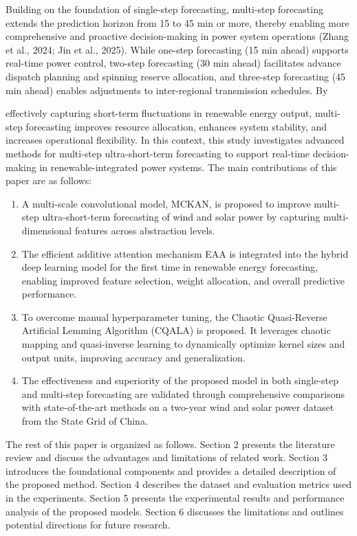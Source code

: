 \documentclass[
  10
]{article}
\begin{document}
Building on the foundation of single-step forecasting, multi-step
forecasting extends the prediction horizon from 15 to 45 min or more,
thereby enabling more comprehensive and proactive decision-making in
power system operations (Zhang et al., 2024; Jin et al., 2025). While
one-step forecasting (15 min ahead) supports real-time power control,
two-step forecasting (30 min ahead) facilitates advance dispatch
planning and spinning reserve allocation, and three-step forecasting (45
min ahead) enables adjustments to inter-regional transmission schedules.
By

effectively capturing short-term fluctuations in renewable energy
output, multi-step forecasting improves resource allocation, enhances
system stability, and increases operational flexibility. In this
context, this study investigates advanced methods for multi-step
ultra-short-term forecasting to support real-time decision-making in
renewable-integrated power systems. The main contributions of this paper
are as follows:

\begin{enumerate}
\def\labelenumi{(\arabic{enumi})}
\item
  A multi-scale convolutional model, MCKAN, is proposed to improve
  multi-step ultra-short-term forecasting of wind and solar power by
  capturing multi-dimensional features across abstraction levels.
\item
  The efficient additive attention mechanism EAA is integrated into the
  hybrid deep learning model for the first time in renewable energy
  forecasting, enabling improved feature selection, weight allocation,
  and overall predictive performance.
\item
  To overcome manual hyperparameter tuning, the Chaotic Quasi-Reverse
  Artificial Lemming Algorithm (CQALA) is proposed. It leverages chaotic
  mapping and quasi-inverse learning to dynamically optimize kernel
  sizes and output units, improving accuracy and generalization.
\item
  The effectiveness and superiority of the proposed model in both
  single-step and multi-step forecasting are validated through
  comprehensive comparisons with state-of-the-art methods on a two-year
  wind and solar power dataset from the State Grid of China.
\end{enumerate}

The rest of this paper is organized as follows. Section 2 presents the
literature review and discuss the advantages and limitations of related
work. Section 3 introduces the foundational components and provides a
detailed description of the proposed method. Section 4 describes the
dataset and evaluation metrics used in the experiments. Section 5
presents the experimental results and performance analysis of the
proposed models. Section 6 discusses the limitations and outlines
potential directions for future research.
\end{document}
